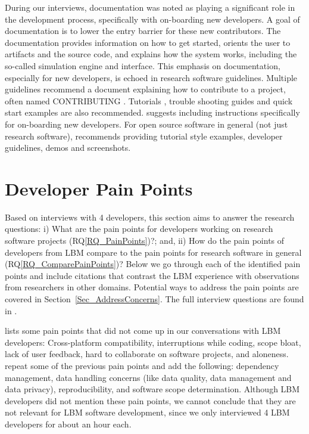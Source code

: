 \documentclass[runningheads]{llncs}
\newcommand{\rqref}[1]{RQ\ref{#1}}
\begin{document}
During our interviews, documentation was noted as playing a significant role in
the development process, specifically with on-boarding new developers. A goal of
documentation is to lower the entry barrier for these new contributors. The
documentation provides information on how to get started, orients the user to
artifacts and the source code, and explains how the system works, including the
so-called simulation engine and interface.  This emphasis on documentation,
especially for new developers, is echoed in research software guidelines.
Multiple guidelines recommend a document explaining how to contribute to a
project, often named CONTRIBUTING \cite{Yo2021,BrettEtAl2021,WilsonEtAl2016,ThielEtAl2020,vanGompelEtAl2016,OrvizEtAl2017,FLOSS2022,JimenezEtAl2017}.
Tutorials \cite{ThielEtAl2020}, trouble shooting guides \cite{OrvizEtAl2017,SSI2022} and quick start examples \cite{ThielEtAl2020,vanGompelEtAl2016} are
also recommended.  \cite{SmithAndRoscoe2018} suggests including instructions
specifically for on-boarding new developers. For open source software in general
(not just research software), \cite{Fogel2005} recommends providing tutorial
style examples, developer guidelines, demos and screenshots.

\section{Developer Pain Points} \label{painpoints}

Based on interviews with 4 developers, this section aims to answer the research
questions: i) What are the pain points for developers working on research
software projects (\rqref{RQ_PainPoints})?; and, ii) How do the pain points of
developers from LBM compare to the pain points for research software in general
(\rqref{RQ_ComparePainPoints})?  Below we go through each of the identified pain
points and include citations that contrast the LBM experience with observations
from researchers in other domains.  Potential ways to address the pain points
are covered in Section~\ref{Sec_AddressConcerns}. The full interview questions
are found in \cite{SmithEtAl2021}.

\cite{PintoEtAl2018} lists some pain points that did not come up in our
conversations with LBM developers: Cross-platform compatibility, interruptions
while coding, scope bloat, lack of user feedback, hard to collaborate on
software projects, and aloneness. \cite{WieseEtAl2019} repeat some of the
previous pain points and add the following: dependency management, data handling
concerns (like data quality, data management and data privacy), reproducibility,
and software scope determination. Although LBM developers did not mention these
pain points, we cannot conclude that they are not relevant for LBM software
development, since we only interviewed 4 LBM developers for about an hour each.
\end{document}
